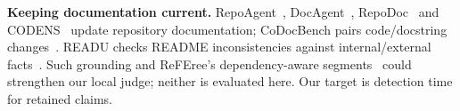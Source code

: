 \textbf{Keeping documentation current.} RepoAgent~\cite{luo2024repoagent}, DocAgent~\cite{yang2025docagent}, RepoDoc~\cite{xu2026repodoc} and CODENS~\cite{kelious2026codens} update repository documentation; CoDocBench pairs code/docstring changes~\cite{pai2025codocbench}. READU checks README inconsistencies against internal/external facts~\cite{baek2026readu}. Such grounding and ReFEree's dependency-aware segments~\cite{bae2026referee} could strengthen our local judge; neither is evaluated here. Our target is detection time for retained claims.
